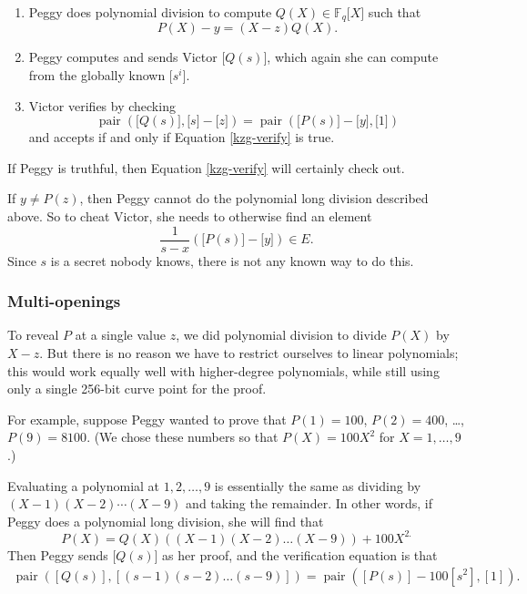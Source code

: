 \begin{algo}
\leavevmode
\begin{enumerate}
\item
  Peggy does polynomial division to compute
  \(Q(X) \in {\mathbb{F}}_{q}\lbrack X\rbrack\) such that
  \[P(X) - y = (X - z)Q(X).\]
\item
  Peggy computes and sends Victor \(\lbrack Q(s) \rbrack\),
  which again she can compute from the globally known
  \(\lbrack s^{i} \rbrack\).
\item
  Victor verifies by checking
\begin{equation}
\label{kzg-verify}  
\operatorname{pair}(\lbrack Q(s) \rbrack,\lbrack s\rbrack - \lbrack z\rbrack) = \operatorname{pair}(\lbrack P(s) \rbrack - \lbrack y\rbrack,\lbrack 1\rbrack)
\end{equation}
and accepts if and only if Equation \eqref{kzg-verify} is true.
\end{enumerate}
\end{algo}

If Peggy is truthful, then Equation \eqref{kzg-verify} will certainly check out.

If \(y \neq P(z)\), then Peggy cannot do the polynomial long division
described above. So to cheat Victor, she needs to otherwise find an
element
\[\frac{1}{s - x}( \lbrack P(s) \rbrack - \lbrack y\rbrack ) \in E.\]
Since \(s\) is a secret nobody knows, there is not any known way to do
this.

\subsubsection{Multi-openings}\label{multi-openings}

To reveal \(P\) at a single value \(z\), we did polynomial division to
divide \(P(X)\) by \(X - z\). But there is no reason we have to restrict
ourselves to linear polynomials; this would work equally well with
higher-degree polynomials, while still using only a single 256-bit curve
point for the proof.

For example, suppose Peggy wanted to prove that \(P(1) = 100\),
\(P(2) = 400\), \ldots, \(P(9) = 8100\). (We chose these numbers so that
\(P(X) = 100X^{2}\) for \(X = 1,\ldots,9\).)

Evaluating a polynomial at \(1,2,\ldots,9\) is essentially the same as
dividing by \((X - 1)(X - 2)\cdots(X - 9)\) and taking the remainder. In
other words, if Peggy does a polynomial long division, she will find
that
\[P(X) = Q(X)( (X - 1)(X - 2)\ldots(X - 9) ) + 100X^{2.}\]
Then Peggy sends \(\lbrack Q(s) \rbrack\) as her proof, and
the verification equation is that \[\begin{aligned}
  \operatorname{pair}( [Q(s)], [ (s - 1)(s - 2)\ldots(s - 9) ] )  = \operatorname{pair}( [ P(s) ] - 100[ s^{2} ],[ 1] ).
\end{aligned}\]

